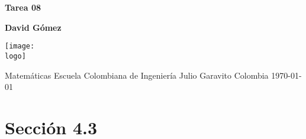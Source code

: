 \documentclass{article}
\newcommand{\logo}{C:/Users/usuario/Documents/U/logo-eci.jpg}
\newcommand{\titlename}{Tarea 08}%
\renewcommand{\author}{David Gómez}%
\begin{document}
\begin{titlepage}
    \begin{center}
        \vspace*{1cm}

        \textbf{\Huge{\titlename}}

        \vspace{1.5cm}

        \textbf{\large{\author}
}
        \vspace{4cm}

        \texttt{[image: \\logo]}

        \vspace{4cm}

        Matemáticas\linebreak
        Escuela Colombiana de Ingeniería Julio Garavito\linebreak
        Colombia\linebreak
        \today

    \end{center}
\end{titlepage}
\clearpage
\tableofcontents
\clearpage

\section{Sección 4.3}
\end{document}
